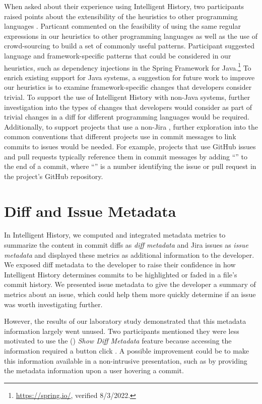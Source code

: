 When asked about their experience using Intelligent History, 
two participants raised points about the extensibility of the heuristics to other programming languages .
Particant  commented on the feasibility of using the same regular expressions in our heuristics 
to other programming languages as well as the use of crowd-sourcing to build a set of commonly useful patterns.
Participant  suggested language and framework-specific patterns that could
be considered in our heuristics, such as dependency injections in the Spring Framework for Java.\footnote{\url{https://spring.io/}, verified 8/3/2022.}
To enrich existing support for Java systems, a suggestion for future work
to improve our heuristics is to examine framework-specific changes that developers consider
trivial. To support the use of Intelligent History with non-Java systems,
further investigation into the types of changes that developers would consider as part of trivial changes
in a diff for different programming languages would be required. 
Additionally, to support projects that use a non-Jira ,
further exploration into the common conventions that different projects use in commit messages
to link commits to issues would be needed.
For example, projects that use GitHub issues and pull requests typically
reference them in commit messages by adding ``'' to the end of a commit,
where ``'' is a number identifying the issue or pull request in the project's GitHub repository.


\section{Diff and Issue Metadata}

In Intelligent History, we computed and integrated metadata metrics to summarize 
the content in commit diffs as \emph{diff metadata} and Jira issues as \emph{issue metadata} 
and displayed these metrics as additional information to the developer.
We exposed diff metadata to the developer to raise their confidence in how Intelligent History
determines commits to be highlighted or faded in a file's commit history.
We presented issue metadata to give the developer a summary of metrics about
an issue, which could help them more quickly determine if an issue was worth investigating further.

However, the results of our laboratory study demonstrated that this metadata information largely went unused.
Two participants mentioned they were less motivated to use the () \textit{Show Diff Metadata} feature
because accessing the information required a button click .
A possible improvement could be to make this information available in a non-intrusive presentation,
such as by providing the metadata information upon a user hovering a commit.

